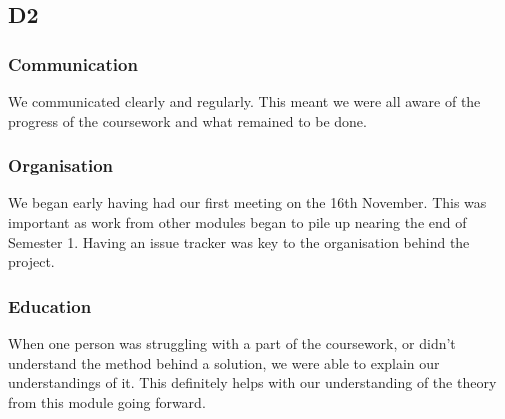 \subsection*{D2}
    \subsubsection*{Communication} We communicated clearly and regularly. This meant we were all aware of the progress of the coursework and what remained to be done. 
    \subsubsection*{Organisation} We began early having had our first meeting on the 16th November. This was important as work from other modules began to pile up nearing the end of Semester 1. Having an issue tracker was key to the organisation behind the project.
    \subsubsection*{Education} When one person was struggling with a part of the coursework, or didn't understand the method behind a solution, we were able to explain our understandings of it. This definitely helps with our understanding of the theory from this module going forward.
